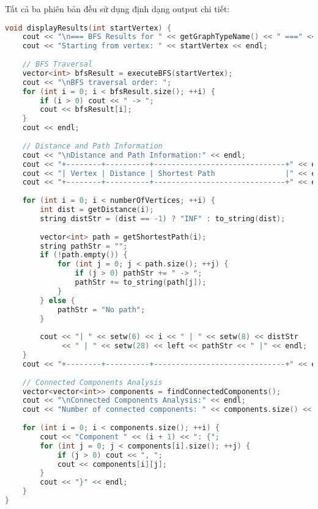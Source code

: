 \documentclass[12pt]{article}
\begin{document}
Tất cả ba phiên bản đều sử dụng định dạng output chi tiết:

\begin{lstlisting}[language=C++, basicstyle=\ttfamily\footnotesize, frame=single]
void displayResults(int startVertex) {
    cout << "\n=== BFS Results for " << getGraphTypeName() << " ===" << endl;
    cout << "Starting from vertex: " << startVertex << endl;
    
    // BFS Traversal
    vector<int> bfsResult = executeBFS(startVertex);
    cout << "\nBFS traversal order: ";
    for (int i = 0; i < bfsResult.size(); ++i) {
        if (i > 0) cout << " -> ";
        cout << bfsResult[i];
    }
    cout << endl;
    
    // Distance and Path Information
    cout << "\nDistance and Path Information:" << endl;
    cout << "+--------+----------+------------------------------+" << endl;
    cout << "| Vertex | Distance | Shortest Path                |" << endl;
    cout << "+--------+----------+------------------------------+" << endl;
    
    for (int i = 0; i < numberOfVertices; ++i) {
        int dist = getDistance(i);
        string distStr = (dist == -1) ? "INF" : to_string(dist);
        
        vector<int> path = getShortestPath(i);
        string pathStr = "";
        if (!path.empty()) {
            for (int j = 0; j < path.size(); ++j) {
                if (j > 0) pathStr += " -> ";
                pathStr += to_string(path[j]);
            }
        } else {
            pathStr = "No path";
        }
        
        cout << "| " << setw(6) << i << " | " << setw(8) << distStr 
             << " | " << setw(28) << left << pathStr << " |" << endl;
    }
    cout << "+--------+----------+------------------------------+" << endl;
    
    // Connected Components Analysis
    vector<vector<int>> components = findConnectedComponents();
    cout << "\nConnected Components Analysis:" << endl;
    cout << "Number of connected components: " << components.size() << endl;
    
    for (int i = 0; i < components.size(); ++i) {
        cout << "Component " << (i + 1) << ": {";
        for (int j = 0; j < components[i].size(); ++j) {
            if (j > 0) cout << ", ";
            cout << components[i][j];
        }
        cout << "}" << endl;
    }
}
\end{lstlisting}
\end{document}
